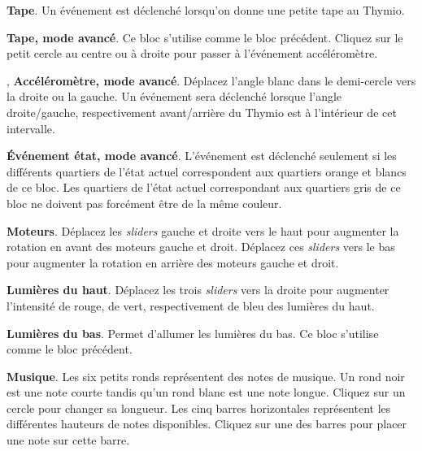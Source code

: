 \bigskip\bigskip\bigskip

 \textbf{Tape}. Un événement est déclenché lorsqu'on donne une petite tape au Thymio.

\bigskip\bigskip\bigskip

 \textbf{Tape, mode avancé}.
Ce bloc s'utilise comme le bloc précédent.
Cliquez sur le petit cercle au centre ou à droite pour passer à l'événement accéléromètre.

\bigskip\bigskip

,  \textbf{Accéléromètre, mode avancé}.
Déplacez l'angle blanc dans le demi-cercle vers la droite ou la gauche.
Un événement sera déclenché lorsque l'angle droite/gauche, respectivement avant/arrière 
du Thymio est à l'intérieur de cet intervalle.

\bigskip\bigskip\bigskip\bigskip

 \textbf{Événement état, mode avancé}.
L'événement est déclenché seulement si les différents quartiers de l'état actuel
correspondent aux quartiers orange et blancs de ce bloc.
Les quartiers de l'état actuel correspondant aux quartiers gris de ce bloc ne doivent pas forcément
être de la même couleur.

\bigskip


 \textbf{Moteurs}.
Déplacez les \emph{sliders} gauche et droite vers le haut pour augmenter la rotation en avant des
moteurs gauche et droit.
Déplacez ces \emph{sliders} vers le bas pour augmenter la rotation en arrière des moteurs
gauche et droit.

\bigskip\bigskip

 \textbf{Lumières du haut}.
Déplacez les trois \emph{sliders} vers la droite pour augmenter l'intensité de rouge, de vert,
respectivement de bleu des lumières du haut.

\bigskip\bigskip

 \textbf{Lumières du bas}.
Permet d'allumer les lumières du bas. Ce bloc s'utilise comme le bloc précédent.

\bigskip\bigskip

 \textbf{Musique}.
Les six petits ronds représentent des notes de musique.
Un rond noir est une note courte tandis qu'un rond blanc est une note longue.
Cliquez sur un cercle pour changer sa longueur.
Les cinq barres horizontales représentent les différentes hauteurs de notes disponibles.
Cliquez sur une des barres pour placer une note sur cette barre.

